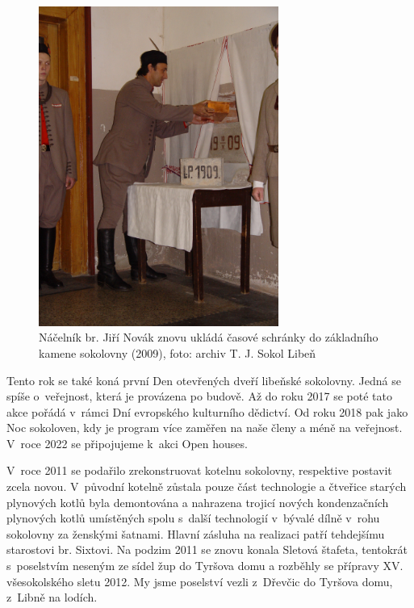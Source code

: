 \documentclass[a5paper, 11pt, twoside]{article}
\begin{document}
\begin{figure}[h]
  \centering
   \includegraphics[width=0.7\textwidth]{img/60_zakladni_kamen_jirkan.jpg}
  \caption*{Náčelník br. Jiří Novák znovu ukládá časové schránky do základního
  kamene sokolovny (2009), foto: archiv T. J. Sokol Libeň}
\end{figure}

Tento rok se také koná první Den otevřených dveří libeňské sokolovny.
Jedná se spíše o~veřejnost, která je provázena po budově. Až do roku
2017 se poté tato akce pořádá v~rámci Dní evropského kulturního
dědictví. Od roku 2018 pak jako Noc sokoloven, kdy je program více
zaměřen na naše členy a méně na veřejnost. V~roce 2022 se připojujeme
k~akci Open houses.

V~roce 2011 se podařilo zrekonstruovat kotelnu sokolovny, respektive
postavit zcela novou. V~původní kotelně zůstala pouze část technologie a
čtveřice starých plynových kotlů byla demontována a nahrazena trojicí
nových kondenzačních plynových kotlů umístěných spolu s~další
technologií v~bývalé dílně v~rohu sokolovny za ženskými šatnami. Hlavní
zásluha na realizaci patří tehdejšímu starostovi br. Sixtovi. Na podzim
2011 se znovu konala Sletová štafeta, tentokrát s~poselstvím neseným ze
sídel žup do Tyršova domu a rozběhly se přípravy XV. všesokolského sletu
2012. My jsme poselství vezli z~Dřevčic do Tyršova domu, z~Libně na
lodích.
\end{document}
